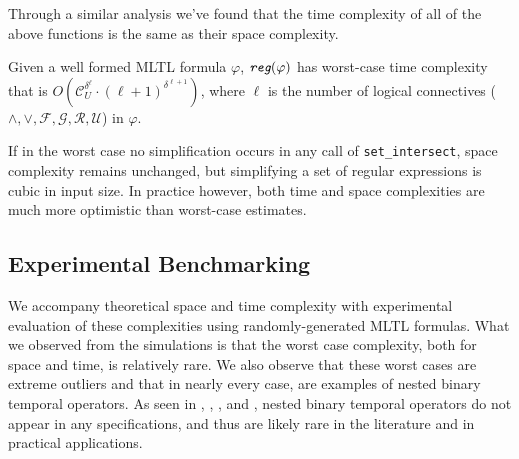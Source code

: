 \documentclass[runningheads]{llncs}
\renewcommand{\phi}{\varphi}
\begin{document}
Through a similar analysis we've found that the time complexity of all of the above functions is the same as their space complexity.
\begin{theorem}
Given a well formed MLTL formula $\phi$, $\emph{\texttt{reg}}(\phi)$ has worst-case time complexity that is $O(\mathcal{C}_U^{\delta ^ \ell} \cdot (\ell + 1)^{\delta^{\ell + 1}})$, where $\ell$ is the number of logical connectives ($\land, \lor, \mathcal{F}, \mathcal{G}, \mathcal{R}, \mathcal{U}$) in $\phi$. 
\end{theorem}
If in the worst case no simplification occurs in any call of \texttt{set\_intersect}, space complexity remains unchanged, but simplifying a set of regular expressions is cubic in input size. In practice however, both time and space complexities are much more optimistic than worst-case estimates. 
 
\subsection{Experimental Benchmarking} \label{WESTexp}
We accompany theoretical space and time complexity with experimental evaluation of these complexities using randomly-generated MLTL formulas. What we observed from the simulations is that the worst case complexity, both for space and time, is relatively rare. We also observe that these worst cases are extreme outliers and that in nearly every case, are examples of nested binary temporal operators. As seen in \cite{HLR21}, \cite{KZJZR20}, \cite{AJR22}, and \cite{HCHJR21}, nested binary temporal operators do not appear in any specifications, and thus are likely rare in the literature and in practical applications.
\end{document}
